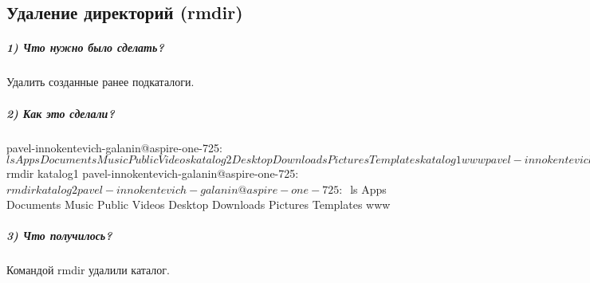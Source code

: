 \subsection{Удаление директорий (rmdir)}

\subparagraph{1) Что нужно было сделать?}

Удалить созданные ранее подкаталоги.

\subparagraph{2) Как это сделали?}

\begin{MyVerbatimCode}[label=Debian terminal]
pavel-innokentevich-galanin@aspire-one-725:~$ ls
Apps     Documents  Music     Public     Videos    katalog2
Desktop  Downloads  Pictures  Templates  katalog1  www
pavel-innokentevich-galanin@aspire-one-725:~$ rmdir katalog1
pavel-innokentevich-galanin@aspire-one-725:~$ rmdir katalog2
pavel-innokentevich-galanin@aspire-one-725:~$ ls
Apps     Documents  Music     Public     Videos
Desktop  Downloads  Pictures  Templates  www
\end{MyVerbatimCode}

\subparagraph{3) Что получилось?}

Командой rmdir удалили каталог.